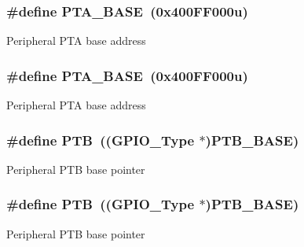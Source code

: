 \subsubsection[{\texorpdfstring{P\+T\+A\+\_\+\+B\+A\+SE}{PTA_BASE}}]{\setlength{\rightskip}{0pt plus 5cm}\#define P\+T\+A\+\_\+\+B\+A\+SE~(0x400\+F\+F000u)}\hypertarget{group__GPIO__Peripheral__Access__Layer_ga6e3037b53880ddd4072d88ed493e6581}{}\label{group__GPIO__Peripheral__Access__Layer_ga6e3037b53880ddd4072d88ed493e6581}
Peripheral P\+TA base address 
\subsubsection[{\texorpdfstring{P\+T\+A\+\_\+\+B\+A\+SE}{PTA_BASE}}]{\setlength{\rightskip}{0pt plus 5cm}\#define P\+T\+A\+\_\+\+B\+A\+SE~(0x400\+F\+F000u)}\hypertarget{group__GPIO__Peripheral__Access__Layer_ga6e3037b53880ddd4072d88ed493e6581}{}\label{group__GPIO__Peripheral__Access__Layer_ga6e3037b53880ddd4072d88ed493e6581}
Peripheral P\+TA base address 
\subsubsection[{\texorpdfstring{P\+TB}{PTB}}]{\setlength{\rightskip}{0pt plus 5cm}\#define P\+TB~(({\bf G\+P\+I\+O\+\_\+\+Type} $\ast$){\bf P\+T\+B\+\_\+\+B\+A\+SE})}\hypertarget{group__GPIO__Peripheral__Access__Layer_gab245b794143f5d4aea6d1a5336b8b33e}{}\label{group__GPIO__Peripheral__Access__Layer_gab245b794143f5d4aea6d1a5336b8b33e}
Peripheral P\+TB base pointer 
\subsubsection[{\texorpdfstring{P\+TB}{PTB}}]{\setlength{\rightskip}{0pt plus 5cm}\#define P\+TB~(({\bf G\+P\+I\+O\+\_\+\+Type} $\ast$){\bf P\+T\+B\+\_\+\+B\+A\+SE})}\hypertarget{group__GPIO__Peripheral__Access__Layer_gab245b794143f5d4aea6d1a5336b8b33e}{}\label{group__GPIO__Peripheral__Access__Layer_gab245b794143f5d4aea6d1a5336b8b33e}
Peripheral P\+TB base pointer 
